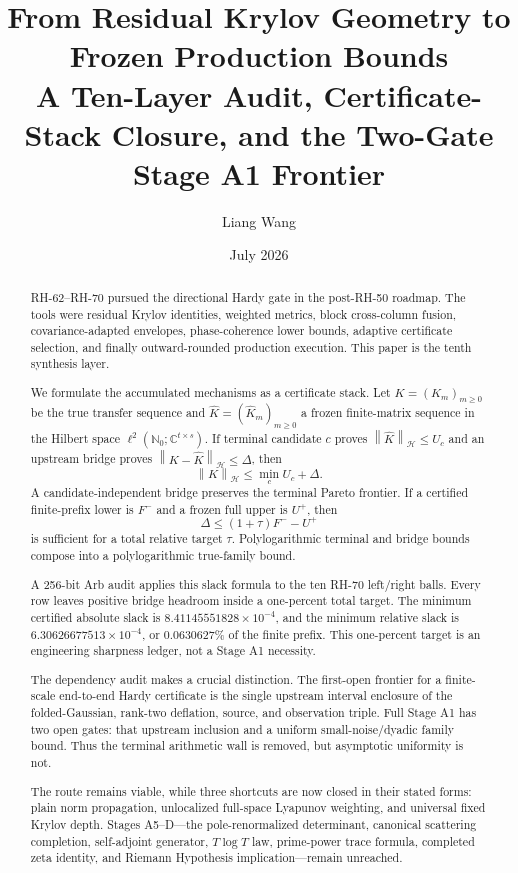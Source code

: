 \documentclass[11pt]{article}
\title{From Residual Krylov Geometry to Frozen Production Bounds\\
\large A Ten-Layer Audit, Certificate-Stack Closure, and the Two-Gate Stage A1 Frontier}
\author{Liang Wang}
\date{July 2026}
\theoremstyle{definition}
\newcommand{\norm}[1]{\left\lVert#1\right\rVert}
\newcommand{\HH}{\mathcal H}
\begin{document}
\maketitle

\begin{abstract}
RH-62--RH-70 pursued the directional Hardy gate in the post-RH-50 roadmap.
The tools were residual Krylov identities, weighted metrics, block
cross-column fusion, covariance-adapted envelopes, phase-coherence lower
bounds, adaptive certificate selection, and finally outward-rounded
production execution.  This paper is the tenth synthesis layer.

We formulate the accumulated mechanisms as a certificate stack.  Let
$K=(K_m)_{m\ge0}$ be the true transfer sequence and
$\widehat K=(\widehat K_m)_{m\ge0}$ a frozen finite-matrix sequence in the
Hilbert space
$\ell^2(\mathbb N_0;\mathbb C^{t\times s})$.  If terminal candidate $c$
proves $\norm{\widehat K}_{\HH}\le U_c$ and an upstream bridge proves
$\norm{K-\widehat K}_{\HH}\le\Delta$, then
\[
 \norm K_{\HH}\le \min_c U_c+\Delta.
\]
A candidate-independent bridge preserves the terminal Pareto frontier.  If
a certified finite-prefix lower is $F^-$ and a frozen full upper is $U^+$,
then
\[
 \Delta\le (1+\tau)F^- - U^+
\]
is sufficient for a total relative target $\tau$.  Polylogarithmic terminal
and bridge bounds compose into a polylogarithmic true-family bound.

A 256-bit Arb audit applies this slack formula to the ten RH-70 left/right
balls.  Every row leaves positive bridge headroom inside a one-percent total
target.  The minimum certified absolute slack is
$8.41145551828\times10^{-4}$, and the minimum relative slack is
$6.30626677513\times10^{-4}$, or $0.0630627\%$ of the finite prefix.  This
one-percent target is an engineering sharpness ledger, not a Stage A1
necessity.

The dependency audit makes a crucial distinction.  The first-open frontier
for a finite-scale end-to-end Hardy certificate is the single upstream
interval enclosure of the folded-Gaussian, rank-two deflation, source, and
observation triple.  Full Stage A1 has two open gates: that upstream
inclusion and a uniform small-noise/dyadic family bound.  Thus the terminal
arithmetic wall is removed, but asymptotic uniformity is not.

The route remains viable, while three shortcuts are now closed in their
stated forms: plain norm propagation, unlocalized full-space Lyapunov
weighting, and universal fixed Krylov depth.  Stages A5--D---the
pole-renormalized determinant, canonical scattering completion,
self-adjoint generator, $T\log T$ law, prime-power trace formula, completed
zeta identity, and Riemann Hypothesis implication---remain unreached.
\end{abstract}
\end{document}
